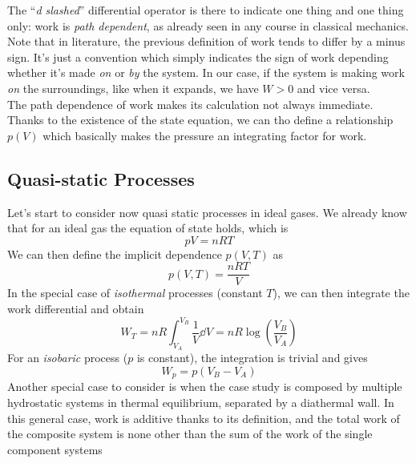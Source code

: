 \documentclass[../qm.tex]{subfiles}
\begin{document}
The ``\textit{d slashed}'' differential operator is there to indicate one thing and one thing only: work is \textit{path dependent}, as already seen in any course in classical mechanics.\\
Note that in literature, the previous definition of work tends to differ by a minus sign. It's just a convention which simply indicates the sign of work depending whether it's made \textit{on} or \textit{by} the system. In our case, if the system is making work \textit{on} the surroundings, like when it expands, we have $W>0$ and vice versa.\\
The path dependence of work makes its calculation not always immediate. Thanks to the existence of the state equation, we can tho define a relationship $p(V)$ which basically makes the pressure an integrating factor for work.
\subsection{Quasi-static Processes}
Let's start to consider now quasi static processes in ideal gases. We already know that for an ideal gas the equation of state holds, which is 
\begin{equation*}
	pV=nRT
\end{equation*}
We can then define the implicit dependence $p(V, T)$ as
\begin{equation*}
	p(V, T)=\frac{nRT}{V}
\end{equation*}
In the special case of \textit{isothermal} processes (constant $T$), we can then integrate the work differential and obtain
\begin{equation}
	W_{T}=nR\int_{V_A}^{V_B}\frac{1}{V}\dd^{}{V}=nR\log\left( \frac{V_B}{V_A} \right)
	\label{eq:isot.work}
\end{equation}
For an \textit{isobaric} process ($p$ is constant), the integration is trivial and gives
\begin{equation}
	W_p=p\left( V_B-V_A \right)
	\label{eq:isob.work}
\end{equation}
Another special case to consider is when the case study is composed by multiple hydrostatic systems in thermal equilibrium, separated by a diathermal wall. In this general case, work is additive thanks to its definition, and the total work of the composite system is none other than the sum of the work of the single component systems
\end{document}
